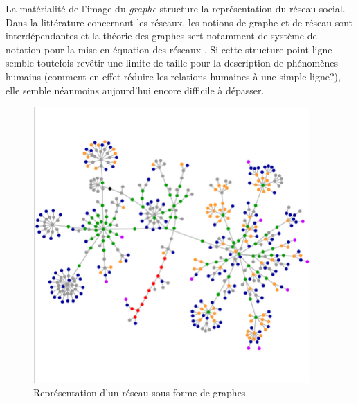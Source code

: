 La matérialité de l{\textquoteright}image du \textit{graphe} structure la représentation du réseau social. Dans la littérature concernant les réseaux, les notions de graphe et de réseau sont interdépendantes et la théorie des graphes sert notamment de système de notation pour la mise en équation des réseaux \citep{Nettleton2013}. Si cette structure point-ligne semble toutefois rev\^etir une limite de taille pour la description de phénomènes humains (comment en effet réduire les relations humaines à une simple ligne?), elle semble néanmoins aujourd{\textquoteright}hui encore difficile à dépasser.

\begin{figure}
    \centering
    \includegraphics[width=4.178in,height=4.1449in]{figures/chap3/chapitre3-img2.png}
    \caption{Représentation d'un réseau sous forme de graphes.}
\end{figure}


